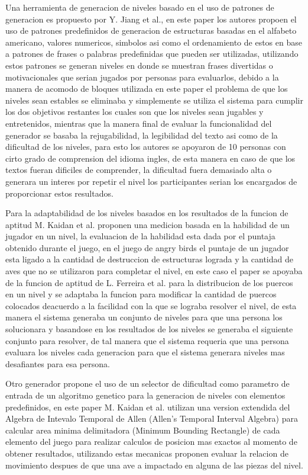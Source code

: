 Una herramienta de generacion de niveles basado en el uso de patrones de
generacion es propuesto por Y. Jiang et al.\cite{Jiang2017}, en este paper los
autores propoen el uso de patrones predefinidos de generacion de estructuras
basadas en el alfabeto americano, valores numericos, simbolos asi como el
ordenamiento de estos en base a patrones de frases o palabras predefinidas que
pueden ser utilizadas, utilizando estos patrones se generan niveles en donde se
muestran frases divertidas o motivacionales que serian jugados por personas para
evaluarlos, debido a la manera de acomodo de bloques utilizada en este paper el
problema de que los niveles sean estables se eliminaba y simplemente se utiliza
el sistema para cumplir los dos objetivos restantes los cuales son que los
niveles sean jugables y entretenidos, mientras que la manera final de evaluar la
funcionalidad del generador se basaba la rejugabilidad, la legibilidad del texto
asi como de la dificultad de los niveles, para esto los autores se apoyaron de
10 personas con cirto grado de comprension del idioma ingles, de esta manera en
caso de que los textos fueran dificiles de comprender, la dificultad fuera
demasiado alta o generara un interes por repetir el nivel los participantes
serian los encargados de proporcionar estos resultados.

Para la adaptabilidad de los niveles basados en los resultados de la funcion de
aptitud M. Kaidan et al.\cite{Kaidan2015} proponen una medicion basada en la
habilidad de un jugador en un nivel, la evaluacion de la habilidad esta dada por
el puntaja obtenido durante el juego, en el juego de angry birds el puntaje de
un jugador esta ligado a la cantidad de destruccion de estructuras lograda y la
cantidad de aves que no se utilizaron para completar el nivel, en este caso el
paper se apoyaba de la funcion de aptitud de L. Ferreira et
al.\cite{Ferreira2014} para la distribucion de los puercos en un nivel y se
adaptaba la funcion para modificar la cantidad de puercos colocados deacuerdo a
la facilidad con la que se lograba resolver el nivel, de esta manera el sistema
generaba un conjunto de niveles para que una persona los solucionara y basandose
en los resultados de los niveles se generaba el siguiente conjunto para
resolver, de tal manera que el sistema requeria que una persona evaluara los
niveles cada generacion para que el sistema generara niveles mas desafiantes
para esa persona.

Otro generador propone el uso de un selector de dificultad como parametro de
entrada de un algoritmo genetico para la generacion de niveles con elementos
predefinidos, en este paper M. Kaidan et al.\cite{Kaidan2016} utilizan una
version extendida del Algebra de Intevalo Temporal de Allen (Allen's Temporal
Interval Algebra)\cite{ALLEN1990} para calcular area minima delimitadora
(Minimum Bounding Rectangle) de cada elemento del juego para realizar calculos
de posicion mas exactos al momento de obtener resultados, utilizando estas
mecanicas proponen evaluar la relacion de movimiento despues de que una ave a
impactado en alguna de las piezas del nivel.

